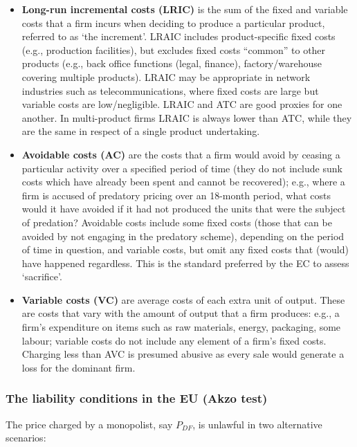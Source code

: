 \begin{itemize}
                \item \textbf{Long-run incremental costs (LRIC)} is the sum of the fixed and variable costs that a firm incurs when deciding to produce a particular product, referred to as ‘the increment’. LRAIC includes product-specific fixed costs (e.g., production facilities), but excludes fixed costs “common” to other products (e.g., back office functions (legal, finance), factory/warehouse covering multiple products). LRAIC may be appropriate in network industries such as telecommunications, where fixed costs are large but variable costs are low/negligible. LRAIC and ATC are good proxies for one another. In multi-product firms LRAIC is always lower than ATC, while they are the same in respect of a single product undertaking.
                \item \textbf{Avoidable costs (AC)} are the costs that a firm would avoid by ceasing a particular activity over a specified period of time (they do not include sunk costs which have already been spent and cannot be recovered); e.g., where a firm is accused of predatory pricing over an 18-month period, what costs would it have avoided if it had not produced the units that were the subject of predation? Avoidable costs include some fixed costs (those that can be avoided by not engaging in the predatory scheme), depending on the period of time in question, and variable costs, but omit any fixed costs that (would) have happened regardless. This is the standard preferred by the EC to assess ‘sacrifice’.
                \item \textbf{Variable costs (VC)} are average costs of each extra unit of output. These are costs that vary with the amount of output that a firm produces: e.g., a firm’s expenditure on items such as raw materials, energy, packaging, some labour; variable costs do not include any element of a firm’s fixed costs. Charging less than AVC is presumed abusive as every sale would generate a loss for the dominant firm.
            \end{itemize}

\newpage
        \subsubsection{The liability conditions in the EU (Akzo test)}

        The price charged by a monopolist, say \( P_{DF} \), is unlawful in two alternative scenarios:
        
